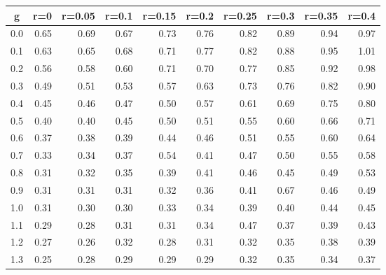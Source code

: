 %
\begin{table}[!tbp]
 \begin{center}
 \begin{tabular}{rrrrrrrrrr}\hline\hline
\multicolumn{1}{c}{g}&\multicolumn{1}{c}{r=0}&\multicolumn{1}{c}{r=0.05}&\multicolumn{1}{c}{r=0.1}&\multicolumn{1}{c}{r=0.15}&\multicolumn{1}{c}{r=0.2}&\multicolumn{1}{c}{r=0.25}&\multicolumn{1}{c}{r=0.3}&\multicolumn{1}{c}{r=0.35}&\multicolumn{1}{c}{r=0.4}\tabularnewline
\hline
0.0&0.65&0.69&0.67&0.73&0.76&0.82&0.89&0.94&0.97\tabularnewline
0.1&0.63&0.65&0.68&0.71&0.77&0.82&0.88&0.95&1.01\tabularnewline
0.2&0.56&0.58&0.60&0.71&0.70&0.77&0.85&0.92&0.98\tabularnewline
0.3&0.49&0.51&0.53&0.57&0.63&0.73&0.76&0.82&0.90\tabularnewline
0.4&0.45&0.46&0.47&0.50&0.57&0.61&0.69&0.75&0.80\tabularnewline
0.5&0.40&0.40&0.45&0.50&0.51&0.55&0.60&0.66&0.71\tabularnewline
0.6&0.37&0.38&0.39&0.44&0.46&0.51&0.55&0.60&0.64\tabularnewline
0.7&0.33&0.34&0.37&0.54&0.41&0.47&0.50&0.55&0.58\tabularnewline
0.8&0.31&0.32&0.35&0.39&0.41&0.46&0.45&0.49&0.53\tabularnewline
0.9&0.31&0.31&0.31&0.32&0.36&0.41&0.67&0.46&0.49\tabularnewline
1.0&0.31&0.30&0.30&0.33&0.34&0.39&0.40&0.44&0.45\tabularnewline
1.1&0.29&0.28&0.31&0.31&0.34&0.47&0.37&0.39&0.43\tabularnewline
1.2&0.27&0.26&0.32&0.28&0.31&0.32&0.35&0.38&0.39\tabularnewline
1.3&0.25&0.28&0.29&0.29&0.29&0.32&0.35&0.34&0.37\tabularnewline
\hline
\end{tabular}

\end{center}

\end{table}

